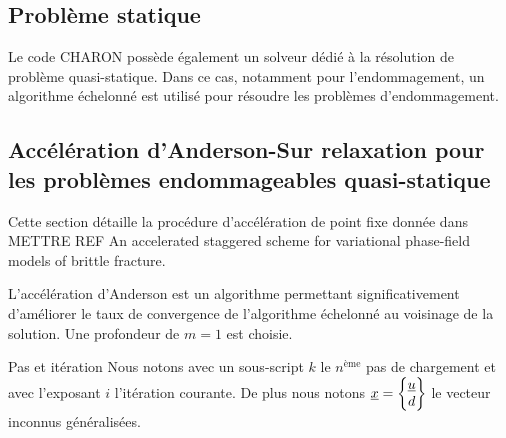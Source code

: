 \documentclass[10pt]{book}
\begin{document}
\begin{appendices}
\chapter{Problème statique}
Le code CHARON possède également un solveur dédié à la résolution de problème quasi-statique. Dans ce cas, notamment pour l'endommagement, un algorithme échelonné est utilisé pour résoudre les problèmes d'endommagement.
\section{Accélération d'Anderson-Sur relaxation pour les problèmes endommageables quasi-statique}
Cette section détaille la procédure d'accélération de point fixe donnée dans METTRE REF An accelerated staggered scheme for variational phase-field models of brittle fracture.

L’accélération d'Anderson est un algorithme permettant significativement d’améliorer le taux de convergence de l'algorithme échelonné au voisinage de la solution. Une profondeur de $m=1$ est choisie. 
\begin{Not}{Pas et itération} Nous notons avec un sous-script \og $k$ \fg{} le $n^{\text{ème}}$ pas de chargement et avec l'exposant \og $i$ \fg{} l'itération courante. De plus nous notons $\underline{x}=\begin{Bmatrix}
\underline{u}\\
d
\end{Bmatrix}$ le vecteur \og inconnus généralisées\fg{}.
\end{Not}

\end{appendices}
\end{document}
